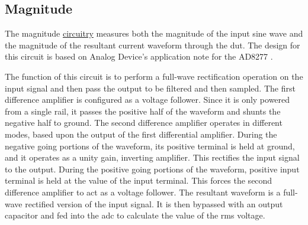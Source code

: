 \subsection{Magnitude}

The magnitude \hyperlink{sch:imph}{circuitry} measures both the magnitude of the input sine wave and the magnitude of the resultant current waveform through the \gls{dut}. The design for this circuit is based on Analog Device's application note for the AD8277 \cite{absCircuit}.

The function of this circuit is to perform a full-wave rectification operation on the input signal and then pass the output to be filtered and then sampled. The first difference amplifier is configured as a voltage follower. Since it is only powered from a single rail, it passes the positive half of the waveform and shunts the negative half to ground. The second difference amplifier operates in different modes, based upon the output of the first differential amplifier. During the negative going portions of the waveform, its positive terminal is held at ground, and it operates as a unity gain, inverting amplifier. This rectifies the input signal to the output. During the positive going portions of the waveform, positive input terminal is held at the value of the input terminal. This forces the second difference amplifier to act as a voltage follower. The resultant waveform is a full-wave rectified version of the input signal. It is then bypassed with an output capacitor and fed into the \gls{adc} to calculate the value of the rms voltage.

